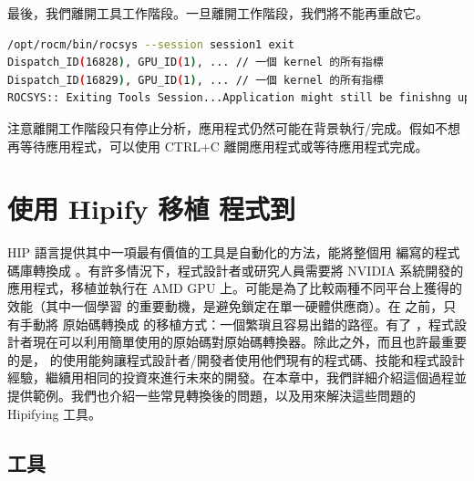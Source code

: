 最後，我們離開工具工作階段。一旦離開工作階段，我們將不能再重啟它。

\begin{lstlisting}[language=bash, caption={離開分析工作階段}, label={lst:Exiting the profiling session}]
/opt/rocm/bin/rocsys --session session1 exit
Dispatch_ID(16828), GPU_ID(1), ... // 一個 kernel 的所有指標
Dispatch_ID(16829), GPU_ID(1), ... // 一個 kernel 的所有指標
ROCSYS:: Exiting Tools Session...Application might still be finishng up..
\end{lstlisting}

注意離開工作階段只有停止分析，應用程式仍然可能在背景執行/完成。假如不想再等待應用程式，可以使用 CTRL+C 離開應用程式或等待應用程式完成。

\section{使用 Hipify 移植  程式到 }

HIP 語言提供其中一項最有價值的工具是自動化的方法，能將整個用  編寫的程式碼庫轉換成 。有許多情況下，程式設計者或研究人員需要將 NVIDIA 系統開發的  應用程式，移植並執行在 AMD GPU 上。可能是為了比較兩種不同平台上獲得的效能（其中一個學習  的重要動機，是避免鎖定在單一硬體供應商）。在  之前，只有手動將  原始碼轉換成  的移植方式：一個繁瑣且容易出錯的路徑。有了 ，程式設計者現在可以利用簡單使用的原始碼對原始碼轉換器。除此之外，而且也許最重要的是， 的使用能夠讓程式設計者/開發者使用他們現有的程式碼、技能和程式設計經驗，繼續用相同的投資來進行未來的開發。在本章中，我們詳細介紹這個過程並提供範例。我們也介紹一些常見轉換後的問題，以及用來解決這些問題的 Hipifying 工具。

\subsection{工具}

